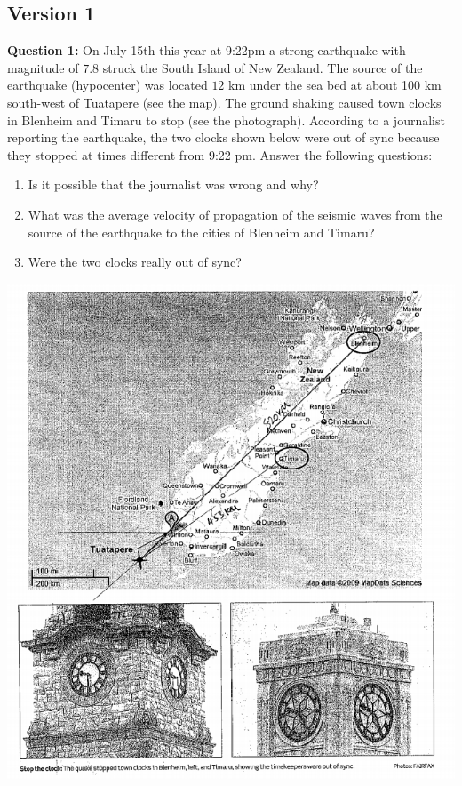 \documentclass{article}
\begin{document}
\subsection*{Version 1}
\textbf{Question 1:} On July 15th this year at 9:22pm a strong earthquake with magnitude of $7.8$ struck the South Island of New Zealand. The source of the earthquake (hypocenter) was located $12$ km under the sea bed at about 100 km south-west of Tuatapere (see the map). The ground shaking caused town clocks in Blenheim and Timaru to stop (see the photograph). According to a journalist reporting the earthquake, the two clocks shown below were out of sync because they stopped at times different from 9:22 pm. Answer the following questions:
\begin{enumerate}
    \item Is it possible that the journalist was wrong and why?
    \item What was the average velocity of propagation of the seismic waves from the source of the earthquake to the cities of Blenheim and Timaru?
    \item Were the two clocks really out of sync?
\end{enumerate}
\begin{center}
    \includegraphics[width=0.8\linewidth]{2009-1-1.png}
\end{center}
\end{document}
